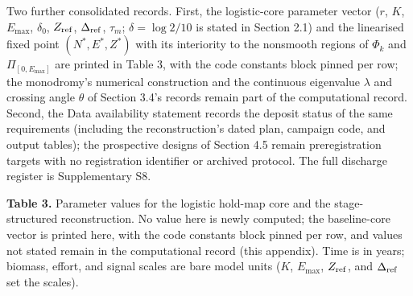 \documentclass[11pt]{article}
\begin{document}
Two further consolidated records. First, the logistic-core parameter
vector (\(r\), \(K\), \(E_{\max}\), \(\delta_0\), \(Z_{\rm ref}\),
\(\Delta_{\rm ref}\), \(\tau_m\); \(\delta = \log 2/10\) is stated in
Section 2.1) and the linearised fixed point \((N^*, E^*, Z^*)\) with its
interiority to the nonsmooth regions of \(\Phi_k\) and
\(\Pi_{[0,E_{\max}]}\) are printed in Table 3, with the code constants
block pinned per row; the monodromy's numerical construction and the
continuous eigenvalue \(\lambda\) and crossing angle \(\theta\) of
Section 3.4's records remain part of the computational record. Second, the Data
availability statement records the deposit status of the same
requirements (including the reconstruction's dated plan, campaign code,
and output tables); the prospective designs of Section 4.5 remain
preregistration targets with no registration identifier or archived
protocol. The full discharge register is Supplementary S8.

\textbf{Table 3.} Parameter values for the
logistic hold-map core and the stage-structured reconstruction. No value
here is newly computed; the baseline-core vector is printed here, with
the code constants block pinned per row, and values not stated remain in
the computational record (this appendix). Time is in years; biomass, effort, and signal scales are bare model units (\(K\), \(E_{\max}\), \(Z_{\rm ref}\), and \(\Delta_{\rm ref}\) set the scales).
\end{document}
